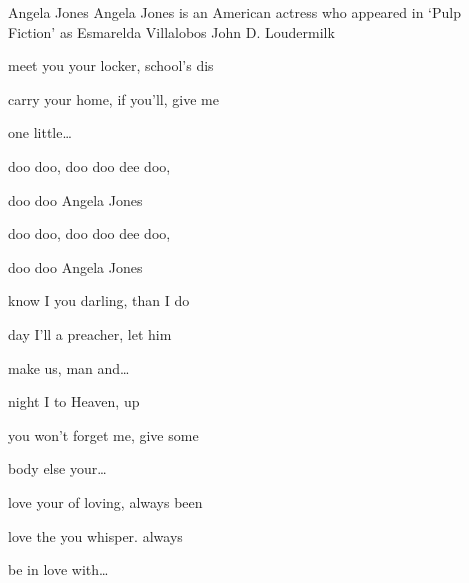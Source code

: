\begin{SBSong}{Angela Jones}
  {Angela Jones is an American actress who appeared in `Pulp Fiction' as Esmarelda Villalobos}
  {John D. Loudermilk}
  \begin{SBVerse}
     meet you  your locker,  school's dis 
    
     carry your  home, if you'll,  give me  
    
    one little\ldots
  \end{SBVerse}
  \begin{SBChorus}
     doo doo,  doo doo dee doo, 
	
	 doo doo Angela Jones
    
     doo doo,  doo doo dee doo, 
	
	 doo doo Angela Jones
  \end{SBChorus}
  \begin{SBVerse}
     know I  you darling,  than I do 
    
     day I'll  a preacher,  let him  
    
    make us, man and\ldots
  \end{SBVerse}
  \begin{SBVerse}
     night I  to Heaven,  up 
    
     you won't  forget me,  give some  
    
    body else your\ldots
  \end{SBVerse}
  \begin{SBVerse}
     love your  of loving,  always been 
    
     love the  you whisper.  always   
    
    be in love with\ldots
  \end{SBVerse}
\end{SBSong}

